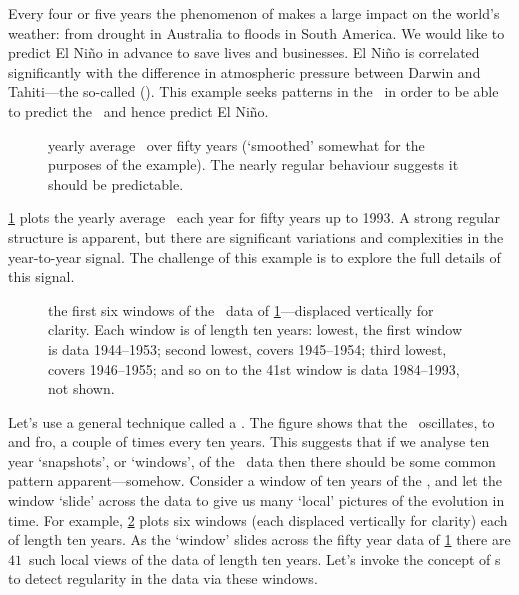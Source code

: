 \begin{example} \label{eg:orthbapp}
Every four or five years the phenomenon of  makes a large impact on the world's weather: from drought in Australia to floods in South America.
We would like to predict El Ni\~no in advance to save lives and businesses.
El Ni\~no is correlated significantly with the difference in atmospheric pressure between Darwin and Tahiti---the so-called  (\soi).
This example seeks patterns in the \soi\ in order to be able to predict the \soi\ and hence predict El Ni\~no.

\begin{figure}
\centering

\caption{yearly average \soi\ over fifty years (`smoothed' somewhat for the purposes of the example).  
The nearly regular behaviour suggests it should be predictable.}
\label{fig:soiRoundData}
\end{figure}

\cref{fig:soiRoundData} plots the yearly average \soi\ each year for fifty years up to 1993.
A strong regular structure is apparent, but there are significant variations and complexities in the year-to-year signal.
The challenge of this example is to explore the full details of this signal.

\begin{figure}
\centering

\caption{the first six windows of the \soi\ data of \cref{fig:soiRoundData}---displaced vertically for clarity. 
Each window is of length ten years: 
lowest, the first window is data 1944--1953;
second lowest, covers 1945--1954;
third lowest, covers 1946--1955; 
and so on to the 41st window is data 1984--1993, not shown.}
\label{fig:soiRoundWind}
\end{figure}

Let's use a general technique called a .
The figure shows that the \soi\ oscillates, to and fro, a couple of times every ten years.
This suggests that if we analyse ten year `snapshots', or `windows', of the \soi\ data then there should be some common pattern apparent---somehow.
Consider a window of ten years of the \soi, and let the window `slide' across the data to give us many `local' pictures of the evolution in time.
For example, \cref{fig:soiRoundWind} plots six windows (each displaced vertically for clarity) each of length ten years.
As the `window' slides across the fifty year data of \cref{fig:soiRoundData} there are \(41\)~such local views of the data of length ten years.
Let's invoke the concept of s to detect regularity in the data via these windows.


\end{example}
